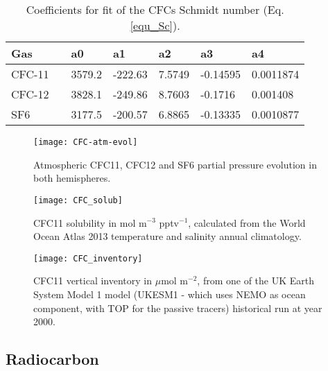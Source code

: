 \documentclass[../main/TOP_manual]{subfiles}
\begin{document}
\begin{table}[!t]
\caption{Coefficients for fit of the CFCs Schmidt number (Eq. \autoref{equ_Sc}).}
\vskip4mm
\centering
\begin{tabular}{l l l l l l l }
\hline
Gas  & & a0 & a1 & a2 & a3 & a4 \\
\hline
CFC-11 & & 3579.2  & -222.63 & 7.5749 & -0.14595 & 0.0011874   \\
CFC-12 & & 3828.1  & -249.86 & 8.7603 & -0.1716  & 0.001408    \\
SF6    & & 3177.5  & -200.57 & 6.8865 & -0.13335 & 0.0010877   \\
\hline
\end{tabular}
\label{tab_Sc}
\end{table}



\begin{figure}[!h]
\centering
\texttt{[image: CFC-atm-evol]}
  \caption{Atmospheric CFC11, CFC12 and SF6 partial pressure evolution in both hemispheres.}
\label{img_cfcatm}
\end{figure}

\begin{figure}[!h]
\centering
\texttt{[image: CFC\_solub]}
  \caption{CFC11 solubility in mol m$^{-3}$ pptv$^{-1}$, calculated from the World Ocean Atlas 2013 temperature and salinity annual climatology.}
\label{img_cfcsol}
\end{figure}

\begin{figure}[!h]
\centering
\texttt{[image: CFC\_inventory]}
  \caption{CFC11 vertical inventory in $\mu$mol m$^{-2}$, from one of the UK Earth System Model 1 model (UKESM1 - which uses NEMO as ocean component, with TOP for the passive tracers) historical run at year 2000.}
\label{img_cfcinv}
\end{figure}


\subsection{Radiocarbon}

%
\end{document}
